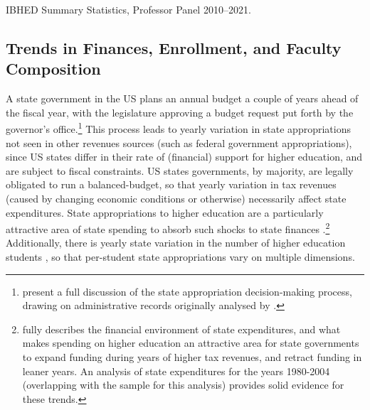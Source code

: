 \documentclass[notitlepage,12pt]{article}
\begin{document}
\begin{table}[h!]
    \singlespacing
    \centering
    \caption{IBHED Summary Statistics, Professor Panel 2010--2021.}
    \makebox[\textwidth][c]{}
    \label{tab:illinois-summary}
\end{table}

\subsection{Trends in Finances, Enrollment, and Faculty Composition}
\label{sec:trends}
A state government in the US plans an annual budget a couple of years ahead of the fiscal year, with the legislature approving a budget request put forth by the governor's office.\footnote{
    \cite{NBERw23736} present a full discussion of the state appropriation decision-making process, drawing on administrative records originally analysed by \cite{parmley2009state}.}
This process leads to yearly variation in state appropriations not seen in other revenues sources (such as federal government appropriations), since US states differ in their rate of (financial) support for higher education, and are subject to fiscal constraints.
US states governments, by majority, are legally obligated to run a balanced-budget, so that yearly variation in tax revenues (caused by changing economic conditions or otherwise) necessarily affect state expenditures.
State appropriations to higher education are a particularly attractive area of state spending to absorb such shocks to state finances \citep{delaney2011state}.\footnote{
    \cite{delaney2011state} fully describes the financial environment of state expenditures, and what makes spending on higher education an attractive area for state governments to expand funding during years of higher tax revenues, and retract funding in leaner years.
    An analysis of state expenditures for the years 1980-2004 (overlapping with the sample for this analysis) provides solid evidence for these trends.
}
Additionally, there is yearly state variation in the number of higher education students \citep{turner2014impact}, so that per-student state appropriations vary on multiple dimensions.
\end{document}
